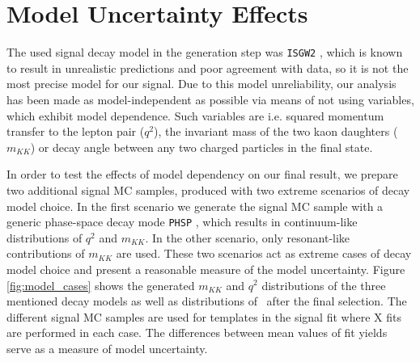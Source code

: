 \section{Model Uncertainty Effects}
The used signal decay model in the generation step was \texttt{ISGW2} \cite{Scora:1995ty}, which is known to result in unrealistic predictions and poor agreement with data, so it is not the most precise model for our signal. Due to this model unreliability, our analysis has been made as model-independent as possible via means of not using variables, which exhibit model dependence. Such variables are i.e. squared momentum transfer to the lepton pair ($q^2$), the invariant mass of the two kaon daughters ($m_{KK}$) or decay angle between any two charged particles in the final state.

In order to test the effects of model dependency on our final result, we prepare two additional signal MC samples, produced with two extreme scenarios of decay model choice. In the first scenario we generate the signal MC sample with a generic phase-space decay mode \texttt{PHSP} \cite{lange2001dj}, which results in continuum-like distributions of $q^2$ and $m_{KK}$. In the other scenario, only resonant-like contributions of $m_{KK}$ are used. These two scenarios act as extreme cases of decay model choice and present a reasonable measure of the model uncertainty. Figure \ref{fig:model_cases} shows the generated $m_{KK}$ and $q^2$ distributions of the three mentioned decay models as well as distributions of \vars~after the final selection. The different signal MC samples are used for templates in the signal fit where X fits are performed in each case. The differences between mean values of fit yields serve as a measure of model uncertainty.

